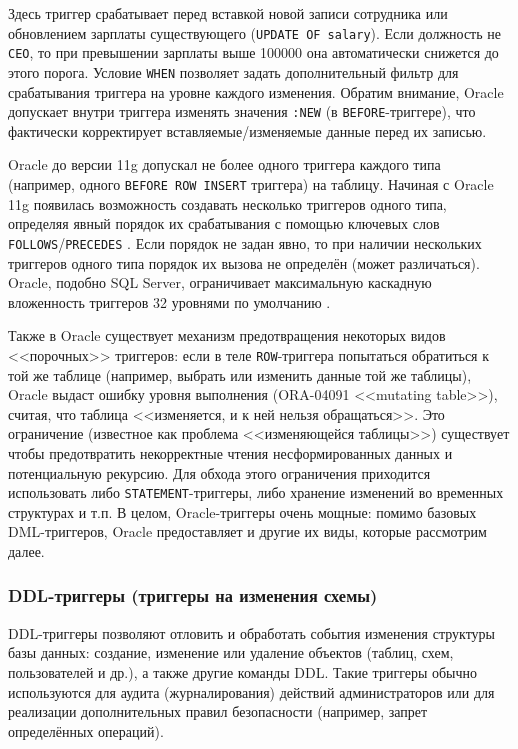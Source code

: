  Здесь триггер срабатывает перед вставкой новой записи сотрудника или обновлением зарплаты существующего (\texttt{UPDATE OF salary}). Если должность не \texttt{CEO}, то при превышении зарплаты выше 100000 она автоматически снижется до этого порога. Условие \texttt{WHEN} позволяет задать дополнительный фильтр для срабатывания триггера на уровне каждого изменения. Обратим внимание, Oracle допускает внутри триггера изменять значения \texttt{:NEW} (в \texttt{BEFORE}-триггере), что фактически корректирует вставляемые/изменяемые данные перед их записью.
 
 Oracle до версии 11g допускал не более одного триггера каждого типа (например, одного \texttt{BEFORE ROW INSERT} триггера) на таблицу. Начиная с Oracle 11g появилась возможность создавать несколько триггеров одного типа, определяя явный порядок их срабатывания с помощью ключевых слов \texttt{FOLLOWS}/\texttt{PRECEDES}  \autocite{oracledbdoc6}. Если порядок не задан явно, то при наличии нескольких триггеров одного типа порядок их вызова не определён (может различаться). Oracle, подобно SQL Server, ограничивает максимальную каскадную вложенность триггеров 32 уровнями по умолчанию  \autocite{oracledbdoc8}. 
 
 Также в Oracle существует механизм предотвращения некоторых видов <<порочных>> триггеров: если в теле \texttt{ROW}-триггера попытаться обратиться к той же таблице (например, выбрать или изменить данные той же таблицы), Oracle выдаст ошибку уровня выполнения (ORA-04091 <<mutating table>>), считая, что таблица <<изменяется, и к ней нельзя обращаться>>. Это ограничение (известное как проблема <<изменяющейся таблицы>>) существует чтобы предотвратить некорректные чтения несформированных данных и потенциальную рекурсию. Для обхода этого ограничения приходится использовать либо \texttt{STATEMENT}-триггеры, либо хранение изменений во временных структурах и т.п. В целом, Oracle-триггеры очень мощные: помимо базовых DML-триггеров, Oracle предоставляет и другие их виды, которые рассмотрим далее.

\subsubsection{DDL-триггеры (триггеры на изменения схемы)}

 DDL-триггеры позволяют отловить и обработать события изменения структуры базы данных: создание, изменение или удаление объектов (таблиц, схем, пользователей и др.), а также другие команды DDL. Такие триггеры обычно используются для аудита (журналирования) действий администраторов или для реализации дополнительных правил безопасности (например, запрет определённых операций).

